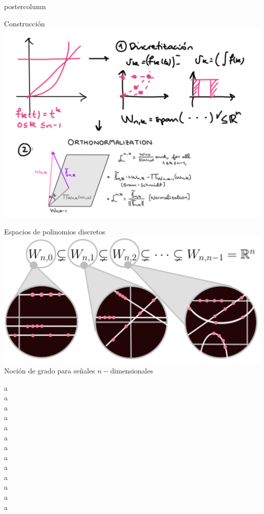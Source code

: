\documentclass[final,hyperref={pdfpagelabels=false}]{beamer}
\begin{document}
\begin{frame}
\begin{columns}
\begin{column}{.49\textwidth}
\begin{beamercolorbox}[center,wd=\textwidth]{postercolumn}
  
			\begin{block}{Construcci\'on}
			\includegraphics[width=0.95\linewidth]{esquema_construccion}	
			\end{block}			                        
            \vfill

            
            
			\begin{block}{Espacios de polinomios discretos }
			\includegraphics[width=0.7\linewidth]{nuevas_lupas}
			Noci\'on
			de grado para se\~nales $n-$dimensionales
			
			a\\
			a\\
			a\\
			a\\
			a\\
			a\\
			a\\
			a\\
			a\\
			a\\
			a\\
			a\\
			a\\
			\end{block}		
			\vfill	
			

\end{beamercolorbox}
\end{column}
\end{columns}
\end{frame}
\end{document}
